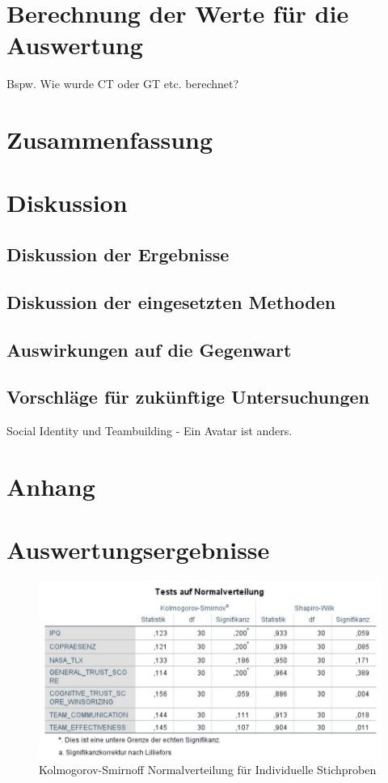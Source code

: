 \documentclass[a4paper,11pt]{article}%
\renewcommand{\\}{\vspace*{0.5\baselineskip} \newline}
\begin{document}
\section{Berechnung der Werte für die Auswertung}
Bspw. Wie wurde CT oder GT etc. berechnet?
\newpage

\clearpage
	\newpage
	\section{Zusammenfassung}
	\newpage
	\section{Diskussion}
		\subsection{Diskussion der Ergebnisse}
		\subsection{Diskussion der eingesetzten Methoden}
		\subsection{Auswirkungen auf die Gegenwart}
		\subsection{Vorschläge für zukünftige Untersuchungen}
		Social Identity und Teambuilding - Ein Avatar ist anders.
	
	\newpage
	\appendix	
	\section*{Anhang}

	\section{Auswertungsergebnisse}
	
	\begin{figure}[H]
		\begin{footnotesize}
			\includegraphics[width=\textwidth]{Abbildungen/Post_QuestionnaireStatistiks/Normalverteilung_30}\\
			\caption{Kolmogorov-Smirnoff Normalverteilung für Individuelle Stichproben}
			\label{fig:KolSmirInd}
		\end{footnotesize}
	\end{figure}	
	
\end{document}
